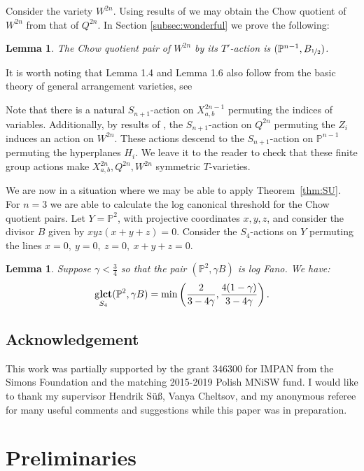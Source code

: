 \documentclass{amsart}
\newtheorem{lemma}[theorem]{Lemma}
\theoremstyle{definition}
\newcommand{\PP}{\mathbb{P}}
\DeclareMathOperator{\glct}{g\bf{lct}}
\begin{document}
Consider the variety \(W^{2n}\). Using results of \cite{kirwan} we may obtain the Chow quotient of \(W^{2n}\) from that of \(Q^{2n}\). In Section \ref{subsec:wonderful} we prove the following:
\begin{lemma}\label{lem:1.6}
The Chow quotient pair of \(W^{2n}\) by its \(T'\)-action is \((\PP^{n-1},B_{\nicefrac{1}{2}})\).
\end{lemma}
\begin{remark}
It is worth noting that Lemma 1.4 and Lemma 1.6 also follow from the basic theory of general arrangement varieties, see \cite[Proposition 3.16, Remark 6.19]{hausen2018torus}
\end{remark}
%
%
%
Note that there is a natural \(S_{n+1}\)-action on \(X^{2n-1}_{a,b}\) permuting the indices of variables. Additionally, by results of \cite{li06}, the \(S_{n+1}\)-action on \(Q^{2n}\) permuting the \(Z_i\) induces an action on \(W^{2n}\). These actions descend to the \(S_{n+1}\)-action on \(\PP^{n-1}\) permuting the hyperplanes \(H_i\). We leave it to the reader to check that these finite group actions make \(X_{a,b}^{2n},Q^{2n},W^{2n}\) symmetric \(T\)-varieties.

We are now in a situation where we may be able to apply Theorem~\ref{thm:SU}. For \(n=3\) we are able to calculate the log canonical threshold for the Chow quotient pairs. Let \(Y = \PP^2\), with projective coordinates \(x,y,z\), and consider the divisor \(B\) given by \(xyz(x+y+z) = 0\). Consider the \(S_4\)-actions on \(Y\) permuting the lines \(x=0, \ y=0, \ z=0, \ x+y+z=0\).
\begin{lemma} \label{lem:1.7}
Suppose \(\gamma < \frac{3}{4}\) so that the pair \((\PP^2,\gamma B)\) is log Fano. We have:
\[
\glct_{S_4}(\PP^2, \gamma B) = \min \left( \frac{2}{3-4 \gamma},\frac{4(1-\gamma)}{3-4\gamma} \right).
\]
\end{lemma}
%
%
%
%
%
%
%
%
%
%
%
%
\subsection*{Acknowledgement}
This work was partially supported by the grant 346300 for IMPAN from the Simons Foundation and the matching 2015-2019 Polish MNiSW fund. I would like to thank my supervisor Hendrik S{\"u}{\ss}, Vanya Cheltsov, and my anonymous referee for many useful comments and suggestions while this paper was in preparation. 
\section{Preliminaries}
\end{document}
